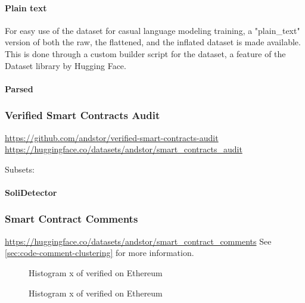 \paragraph{Plain text}
\label{sec:verified-smart-contracts-plain-text}
For easy use of the dataset for casual language modeling training, a "plain\_text" version of both the raw, the flattened, and the inflated dataset is made available. This is done through a custom builder script for the dataset, a feature of the Dataset library by Hugging Face.

\paragraph{Parsed}
\label{sec:verified-smart-contracts-parsed}

\subsubsection{Verified Smart Contracts Audit}
\label{sec:verified-smart-contracts-audit}

\url{https://github.com/andstor/verified-smart-contracts-audit}
\url{https://huggingface.co/datasets/andstor/smart_contracts_audit}

Subsets:
\paragraph{SoliDetector}
\label{sec:verified-smart-contracts-audit-solidector}



\subsubsection{Smart Contract Comments}
\label{sec:verified-smart-contracts-comments}

\url{https://huggingface.co/datasets/andstor/smart_contract_comments}
See \cref{sec:code-comment-clustering} for more information.


\begin{figure}[ht]
    \centering
    
    \caption{Histogram \small x of verified  on Ethereum}
\end{figure}



\begin{figure}[ht]
    \centering
    
    \caption{Histogram \small x of verified  on Ethereum}
\end{figure}



